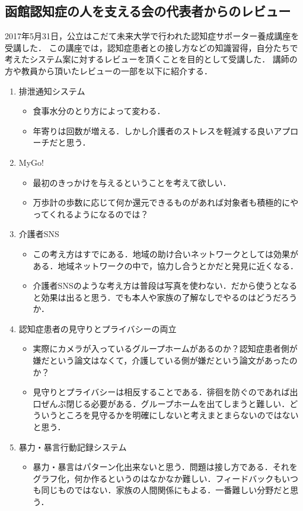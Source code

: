 \documentclass[../report]{subfiles}
\begin{document}
\subsection{函館認知症の人を支える会の代表者からのレビュー}\label{sec:review-sasaerukai}
2017年5月31日，公立はこだて未来大学で行われた認知症サポーター養成講座を受講した．
この講座では，認知症患者との接し方などの知識習得，自分たちで考えたシステム案に対するレビューを頂くことを目的として受講した．
講師の方や教員から頂いたレビューの一部を以下に紹介する．
\begin{enumerate}
    \item 排泄通知システム
        \begin{itemize}
            \item 食事水分のとり方によって変わる．
            \item 年寄りは回数が増える．しかし介護者のストレスを軽減する良いアプローチだと思う．
        \end{itemize}
    \item MyGo!
        \begin{itemize}
            \item 最初のきっかけを与えるということを考えて欲しい．
            \item 万歩計の歩数に応じて何か還元できるものがあれば対象者も積極的にやってくれるようになるのでは？
        \end{itemize}
    \item 介護者SNS
        \begin{itemize}
            \item この考え方はすでにある．地域の助け合いネットワークとしては効果がある．地域ネットワークの中で，協力し合うとかだと発見に近くなる．
            \item 介護者SNSのような考え方は普段は写真を使わない．だから使うとなると効果は出ると思う．でも本人や家族の了解なしでやるのはどうだろうか．
        \end{itemize}
    \item 認知症患者の見守りとプライバシーの両立
        \begin{itemize}
            \item 実際にカメラが入っているグループホームがあるのか？認知症患者側が嫌だという論文はなくて，介護している側が嫌だという論文があったのか？
            \item 見守りとプライバシーは相反することである．徘徊を防ぐのであれば出口ぜんぶ閉じる必要がある．グループホームを出てしまうと難しい．どういうところを見守るかを明確にしないと考えまとまらないのではないと思う．
        \end{itemize}
    \item 暴力・暴言行動記録システム
        \begin{itemize}
            \item 暴力・暴言はパターン化出来ないと思う．問題は接し方である．それをグラフ化，何か作るというのはなかなか難しい．フィードバックもいつも同じものではない．家族の人間関係にもよる．一番難しい分野だと思う．
        \end{itemize}
\end{enumerate}
\end{document}
